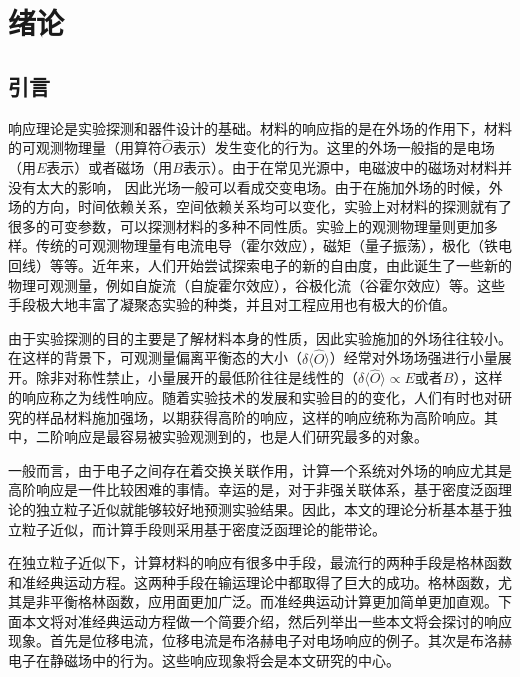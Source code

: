 \chapter{绪论}
\label{cha:intro}

\section{引言}

响应理论是实验探测和器件设计的基础。材料的响应指的是在外场的作用下，材料的可观测物理量（用算符$\hat{O}$表示）发生变化的行为。这里的外场一般指的是电场（用$E$表示）或者磁场（用$B$表示）。由于在常见光源中，电磁波中的磁场对材料并没有太大的影响， 因此光场一般可以看成交变电场。由于在施加外场的时候，外场的方向，时间依赖关系，空间依赖关系均可以变化，实验上对材料的探测就有了很多的可变参数，可以探测材料的多种不同性质。实验上的观测物理量则更加多样。传统的可观测物理量有电流电导（霍尔效应\cite{klitzing_new_1980}），磁矩（量子振荡\cite{SdH,dHvA}），极化（铁电回线\cite{cohen_origin_1992}）等等。近年来，人们开始尝试探索电子的新的自由度，由此诞生了一些新的物理可观测量，例如自旋流（自旋霍尔效应\cite{hasan2010,qi2011}），谷极化流（谷霍尔效应\cite{xiao_coupled_2012}）等。这些手段极大地丰富了凝聚态实验的种类，并且对工程应用也有极大的价值。


由于实验探测的目的主要是了解材料本身的性质，因此实验施加的外场往往较小。在这样的背景下，可观测量偏离平衡态的大小（$\delta\langle\hat{O}\rangle$）经常对外场场强进行小量展开。除非对称性禁止，小量展开的最低阶往往是线性的（$\delta\langle\hat{O}\rangle \propto E$或者$B$），这样的响应称之为线性响应。随着实验技术的发展和实验目的的变化，人们有时也对研究的样品材料施加强场，以期获得高阶的响应，这样的响应统称为高阶响应。其中，二阶响应是最容易被实验观测到的，也是人们研究最多的对象。

一般而言，由于电子之间存在着交换关联作用，计算一个系统对外场的响应尤其是高阶响应是一件比较困难的事情。幸运的是，对于非强关联体系，基于密度泛函理论的独立粒子近似就能够较好地预测实验结果。因此，本文的理论分析基本基于独立粒子近似，而计算手段则采用基于密度泛函理论的能带论。

在独立粒子近似下，计算材料的响应有很多中手段，最流行的两种手段是格林函数和准经典运动方程\cite{xiao_berry_2010}。这两种手段在输运理论中都取得了巨大的成功。格林函数，尤其是非平衡格林函数，应用面更加广泛。而准经典运动计算更加简单更加直观。下面本文将对准经典运动方程做一个简要介绍，然后列举出一些本文将会探讨的响应现象。首先是位移电流\cite{sipe_second-order_2000,von_baltz_theory_1981}，位移电流是布洛赫电子对电场响应的例子。其次是布洛赫电子在静磁场中的行为。这些响应现象将会是本文研究的中心。

